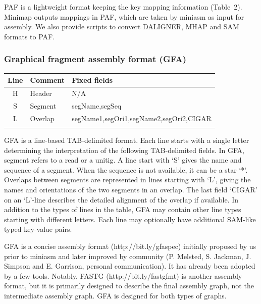 \documentclass{bioinfo}
\begin{document}
\begin{methods}
PAF is a lightweight format keeping the key mapping information (Table~2).
Minimap outputs mappings in PAF, which are taken by miniasm as input for
assembly. We also provide scripts to convert DALIGNER, MHAP and SAM formats to
PAF.

\subsubsection{Graphical fragment assembly format (GFA)}

\begin{table}[tb]
{\footnotesize
\begin{tabular}{clp{5.8cm}}
\toprule
Line & Comment & Fixed fields \\
\midrule
H    & Header  & N/A \\
S    & Segment & segName,segSeq \\
L    & Overlap & segName1,segOri1,segName2,segOri2,CIGAR \\
\botrule
\end{tabular}
}{GFA is a line-based TAB-delimited format. Each line starts with a single
letter determining the interpretation of the following TAB-delimited fields. In
GFA, segment refers to a read or a unitig. A line start with `S' gives the name
and sequence of a segment. When the sequence is not available, it can be a star
`*'. Overlaps between segments are represented in lines starting with `L',
giving the names and orientations of the two segments in an overlap. The last
field `CIGAR' on an `L'-line describes the detailed alignment of the overlap if
available. In addition to the types of lines in the table, GFA may contain
other line types starting with different letters. Each line may optionally have
additional SAM-like typed key-value pairs.}
\end{table}

GFA is a concise assembly format (http://bit.ly/gfaspec) initially proposed by
us prior to miniasm and later improved by community (P. Melsted, S.  Jackman,
J. Simpson and E. Garrison, personal communication). It has already been
adopted by a few tools.  Notably, FASTG (http://bit.ly/fastgfmt) is another
assembly format, but it is primarily designed to describe the final assembly
graph, not the intermediate assembly graph. GFA is designed for both types of
graphs.

\end{methods}
\end{document}
